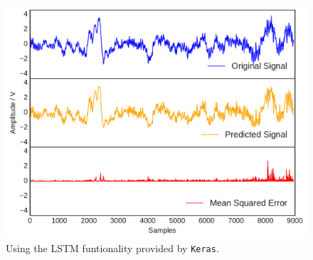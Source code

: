 \begin{figure}[t]
    \includegraphics[width=1.0\textwidth]{fig/neuralnetwork.pdf}
    \caption[Neural Network]{Using the LSTM funtionality provided by \texttt{Keras}.}
    \label{fig:kmeanerror}
\end{figure}
